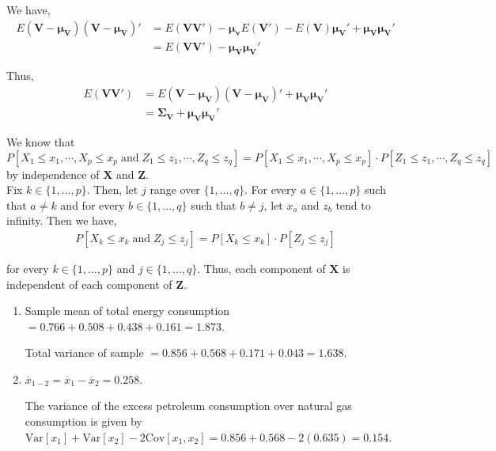 \documentclass[12pt]{article}
\newenvironment{problem}[2][Problem]{\begin{trivlist}
\item[\hskip \labelsep {\bfseries #1}\hskip \labelsep {\bfseries #2.}]}{\end{trivlist}}
\newcommand{\vct}{\mathbf}
\begin{document}
\begin{problem}{3.16}
\end{problem}

We have,
\begin{align*}
E(\vct{V} - \vct{\mu_V})(\vct{V} - \vct{\mu_V})' &= E(\vct{V}\vct{V}') - \vct{\mu_v}E(\vct{V}') - E(\vct{V})\vct{\mu_V}' + \vct{\mu_V}\vct{\mu_V}'\\
&= E(\vct{V}\vct{V}') - \vct{\mu_V}\vct{\mu_V}' 
\end{align*}

Thus,
\begin{align*}
E(\vct{V}\vct{V}') &= E(\vct{V} - \vct{\mu_V})(\vct{V} - \vct{\mu_V})' + \vct{\mu_V}\vct{\mu_V}' \\
&= \vct{\Sigma_V} + \vct{\mu_V}\vct{\mu_V}'
\end{align*}

\begin{problem}{3.17}
\end{problem}

We know that $P[X_1 \leq x_1, \cdots , X_p \leq x_p \; \mathrm{and} \; Z_1 \leq z_1, \cdots , Z_q \leq z_q] = P[X_1 \leq x_1, \cdots , X_p \leq x_p] \cdot P[Z_1 \leq z_1, \cdots , Z_q \leq z_q]$ by independence of $\vct{X}$ and $\vct{Z}$.\\

Fix $k \in \{1, ..., p\}$. Then, let $j$ range over $\{1, ..., q\}$. For every $a \in \{1, ..., p\}$ such that $a \neq k$ and for every $b \in \{1, ..., q\}$ such that $b \neq j$, let $x_a$ and $z_b$ tend to infinity. Then we have,
\begin{align*}
P[X_k \leq x_k \; \mathrm{and} \; Z_j \leq z_j] = P[X_k \leq x_k] \cdot P[Z_j \leq z_j] 
\end{align*}

for every $k \in \{1, ..., p\}$ and $j \in \{1, ..., q\}$. Thus, each component of $\vct{X}$ is independent of each component of $\vct{Z}$.

\begin{problem}{3.18}
\end{problem}

\begin{enumerate}[label=\alph*)]
	\item Sample mean of total energy consumption $= 0.766 + 0.508 + 0.438 + 0.161 = 1.873$.
	
	Total variance of sample $= 0.856 + 0.568 + 0.171 + 0.043 = 1.638$.
	
	\item $\overline{x}_{1-2} = \overline{x}_1 - \overline{x}_2 = 0.258$.
	
	The variance of the excess petroleum consumption over natural gas consumption is given by $\mathrm{Var}[x_1] + \mathrm{Var}[x_2] - 2\mathrm{Cov}[x_1, x_2] = 0.856 + 0.568 - 2(0.635) = 0.154$.
	
\end{enumerate}
\end{document}
